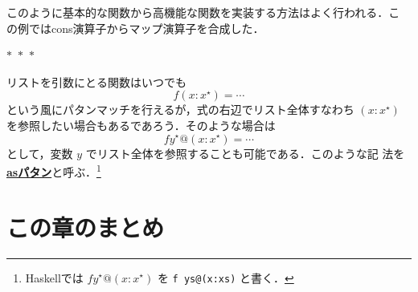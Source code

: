 \documentclass[a5paper,twoside,fleqn]{jsbook}
\newcommand{\separator}{\begin{center}$*$~$*$~$*$\end{center}}
\newcommand{\programminglanguage}[1]{\textsf{#1}}
\newcommand{\haskell}{\programminglanguage{Haskell}}
\newcommand{\keyword}[1]{{\underline{\textbf{#1}}}}
\newcommand{\code}[1]{\texttt{#1}}
\newcommand{\mList}[1]{{#1}^\mathrm{\star}}
\begin{document}
このように基本的な関数から高機能な関数を実装する方法はよく行われる．こ
の例ではcons演算子からマップ演算子を合成した．

\separator

リストを引数にとる関数はいつでも
\begin{equation}
f(x:\mList{x})=\dotsb
\end{equation}
という風にパタンマッチを行えるが，式の右辺でリスト全体すなわち
$(x:\mList{x})$ を参照したい場合もあるであろう．そのような場合は
\begin{equation}
f\mList{y}@(x:\mList{x})=\dotsb
\end{equation}
として，変数 $y$ でリスト全体を参照することも可能である．このような記
法を\keyword{asパタン}と呼ぶ．\footnote{\haskell では
  $f\mList{y}@(x:\mList{x})$ を \code{f ys@(x:xs)} と書く．}

\section{この章のまとめ}
\end{document}
